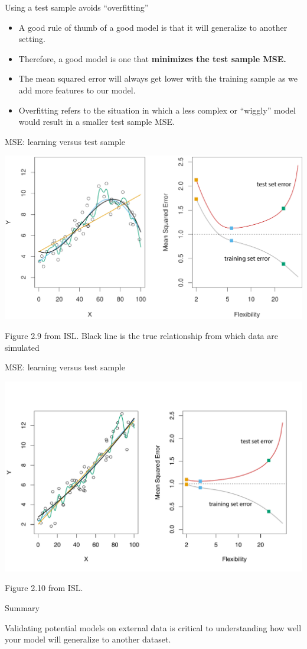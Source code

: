\documentclass[table]{beamer}\usepackage[]{graphicx}\usepackage[]{color}
\begin{document}

\begin{frame}{Using a test sample avoids ``overfitting''}
\begin{itemize}
  \item A good rule of thumb of a good model is that it will generalize to another setting.
  \item Therefore, a good model is one that {\bf minimizes the test sample MSE.}
  \item The mean squared error will always get lower with the training sample as we add more features to our model.
  \item {\color{orange} Overfitting} refers to the situation in which a less complex or ``wiggly'' model would result in a smaller test sample MSE.
\end{itemize}
\end{frame}



\begin{frame}{MSE: learning versus test sample}
\centerline{
\includegraphics[scale=.6,angle=0]{figure-static/2_9-all.pdf}
}

Figure 2.9 from ISL. Black line is the true relationship from which data are simulated
\end{frame}

\begin{frame}{MSE: learning versus test sample}
\centerline{
\includegraphics[scale=.6,angle=0]{figure-static/2_10.pdf}
}
Figure 2.10 from ISL.

\end{frame}


\begin{frame}{Summary}

Validating potential models on external data is critical to understanding how well your model will generalize to another dataset.

\end{frame}
\end{document}

